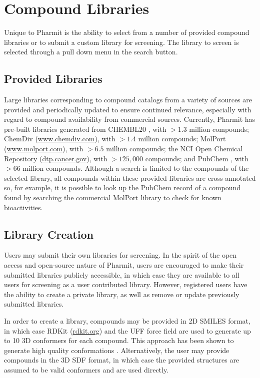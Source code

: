 \section{Compound Libraries}

Unique to Pharmit is the ability to select from a number of provided compound libraries or to submit a custom library for screening.  The library to screen is selected through a pull down menu in the search button.  

\subsection{Provided Libraries}

Large libraries corresponding to compound catalogs from a variety of sources are provided and periodically updated to ensure continued relevance, especially with regard to compound availability from commercial sources.  Currently, Pharmit has pre-built libraries generated from CHEMBL20 \cite{Gaulton_2011}, with $>1.3$ million compounds; ChemDiv (\url{www.chemdiv.com}), with $>1.4$ million compounds; MolPort (\url{www.molport.com}), with $>6.5$ million compounds; the NCI Open Chemical Repository (\url{dtp.cancer.gov}), with $>125,000$ compounds; and PubChem \cite{Kim_2015}, with $>66$ million compounds. 
 Although a search is limited to the compounds of the selected library, all compounds within these provided libraries are cross-annotated so, for example, it is possible to look up the PubChem record of a compound found by searching the commercial MolPort library to check for known bioactivities.


\subsection{Library Creation}

Users may submit their own libraries for screening.  In the spirit of the open access and open-source nature of Pharmit, users are encouraged to make their submitted libraries publicly accessible, in which case they are available to all users for screening as a user contributed library.  However, registered users have the ability to create a private library, as well as remove or update previously submitted libraries. 

In order to create a library, compounds may be provided in 2D SMILES format, in which case RDKit (\url{rdkit.org}) and the UFF force field \cite{Rappe_1992} are used to generate up to 10 3D conformers for each compound.  This approach has been shown to generate high quality conformations \cite{Ebejer_2012}.  Alternatively, the user may provide compounds in the 3D SDF format, in which case the provided structures are assumed to be valid conformers and are used directly.
